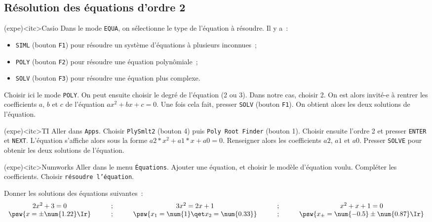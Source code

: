 \documentclass[../main/main.tex]{subfiles}
\begin{document}
\subsection{R\'esolution des équations d'ordre 2}

\begin{tcb}(expe)<itc>{Casio}
	Dans le mode \texttt{EQUA}, on sélectionne le type de l'équation à résoudre.
	Il y a~:
	\begin{itemize}
		\item \texttt{SIML} (bouton \texttt{F1}) pour résoudre un système
		      d'équations à plusieurs inconnues~;
		\item \texttt{POLY} (bouton \texttt{F2}) pour résoudre une équation
		      polynômiale~;
		\item \texttt{SOLV} (bouton \texttt{F3}) pour résoudre une équation plus
		      complexe.
	\end{itemize}
	Choisir ici le mode \texttt{POLY}. On peut ensuite choisir le degré de
	l'équation (2 ou 3). Dans notre cas, choisir 2. On est alors invité-e à
	rentrer les coefficients $a$, $b$ et $c$ de l'équation $ax^2+bx+c=0$. Une fois
	cela fait, presser \texttt{SOLV} (bouton \texttt{F1}). On obtient alors les
	deux solutions de l'équation.
\end{tcb}

\begin{tcb}(expe)<itc>{TI}
	Aller dans \texttt{Apps}. Choisir \texttt{PlySmlt2} (bouton 4) puis
	\texttt{Poly Root Finder} (bouton 1). Choisir ensuite l'ordre 2 et presser
	\texttt{ENTER} et \texttt{NEXT}. L'équation s'affiche alors sous la forme
	$a2*x^2+a1*x+a0=0$. Renseigner alors les coefficients $a2$, $a1$ et $a0$.
	Presser \texttt{SOLVE} pour obtenir les deux solutions de l'équation.
\end{tcb}

\begin{tcb}(expe)<itc>{Numworks}
	Aller dans le menu \texttt{Équations}. Ajouter une équation, et choisir le
	modèle d'équation voulu. Compléter les coefficients. Choisir \texttt{résoudre
		l'équation}.
\end{tcb}

Donner les solutions des équations suivantes~:
\begin{gather*}
	\begin{array}{ccccc}
		2x^2+3 = 0
		\qquad & ; & \qquad
		3x^2 = 2x+1
		\qquad & ; & \qquad
		x^2+x+1 = 0
		\\
		\psw{
			x = \pm \num{1.22}\Ir
		}
		\qquad & ; & \qquad
		\psw{
			x_1 = \num{1} \qet x_2 = \num{0.33}
		}
		\qquad & ; & \qquad
		\psw{
			x_\pm = \num{-0.5} \pm \num{0.87}\Ir
		}
	\end{array}
\end{gather*}
\end{document}
